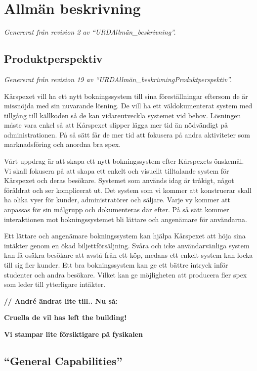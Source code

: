 \documentclass[a4paper, twoside, 11pt, titlepage]{article}
\begin{document}
\clearpage
	\section{Allmän beskrivning}


\emph{Genererat från revision 2 av ``URDAllmän\_beskrivning''.}

	\subsection{Produktperspektiv}


	\emph{Genererat från revision 19 av ``URDAllmän\_beskrivningProduktperspektiv''.}

	Kårspexet vill ha ett nytt bokningssystem till sina föreställningar eftersom de är missnöjda med sin nuvarande lösning. De vill ha ett väldokumenterat system med tillgång till källkoden så de kan vidareutveckla systemet vid behov. Lösningen måste vara enkel så att Kårspexet slipper lägga mer tid än nödvändigt på administrationen. På så sätt får de mer tid att fokusera på andra aktiviteter som marknadsföring och anordna bra spex.

	Vårt uppdrag är att skapa ett nytt bokningssystem efter Kårspexets önskemål. Vi skall fokusera på att skapa ett enkelt och visuellt tilltalande system för Kårspexet och deras besökare. Systemet som används idag är tråkigt, något föråldrat och ser komplicerat ut. Det system som vi kommer att konstruerar skall ha olika vyer för kunder, administratörer och säljare. Varje vy kommer att anpassas för sin målgrupp och dokumenteras där efter. På så sätt kommer interaktionen mot bokningssystemet bli lättare och angenämare för användarna.

	Ett lättare och angenämare bokningssystem kan hjälpa Kårspexet att höja sina intäkter genom en ökad biljettförsäljning. Svåra och icke användarvänliga system kan få osäkra besökare att avstå från ett köp, medans ett enkelt system kan locka till sig fler kunder. Ett bra bokningssystem kan ge ett bättre intryck inför studenter och andra besökare. Vilket kan ge möjligheten att producera fler spex som leder till ytterligare intäkter.

	\textbf{// André ändrat lite till..  Nu så:}

	\textbf{Cruella de vil has left the building!}

	\textbf{Vi stampar lite försiktigare på fysikalen}

	\subsection{``General Capabilities''}
\end{document}
